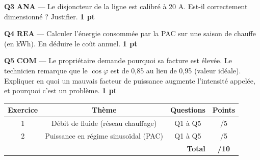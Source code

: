 \documentclass[a4paper,11pt]{article}
\newcommand{\pts}[1]{\hfill\textcolor{gris}{\small\textbf{#1}}}
\newcommand{\comp}[1]{\colorbox{blue!10}{\scriptsize\textbf{#1}}}
\begin{document}
\textbf{Q3} \comp{ANA} — Le disjoncteur de la ligne est calibré à 20 A. Est-il correctement dimensionné ? Justifier. \pts{1 pt}

\begin{reponsebox}[2.5cm]
\dotfill

\dotfill
\end{reponsebox}

\textbf{Q4} \comp{REA} — Calculer l'énergie consommée par la PAC sur une saison de chauffe (en kWh). En déduire le coût annuel. \pts{1 pt}

\begin{reponsebox}[3.5cm]
\dotfill

\dotfill

\dotfill

\dotfill
\end{reponsebox}

\textbf{Q5} \comp{COM} — Le propriétaire demande pourquoi sa facture est élevée. Le technicien remarque que le $\cos\varphi$ est de 0,85 au lieu de 0,95 (valeur idéale). Expliquer en quoi un mauvais facteur de puissance augmente l'intensité appelée, et pourquoi c'est un problème. \pts{1 pt}

\begin{reponsebox}[4cm]
\dotfill

\dotfill

\dotfill

\dotfill

\dotfill
\end{reponsebox}

\vfill

\begin{center}
\begin{tabular}{|c|c|c|c|}
\hline
\textbf{Exercice} & \textbf{Thème} & \textbf{Questions} & \textbf{Points} \\
\hline
1 & Débit de fluide (réseau chauffage) & Q1 à Q5 & /5 \\
\hline
2 & Puissance en régime sinusoïdal (PAC) & Q1 à Q5 & /5 \\
\hline
\multicolumn{3}{|r|}{\textbf{Total}} & \textbf{/10} \\
\hline
\end{tabular}
\end{center}
\end{document}
